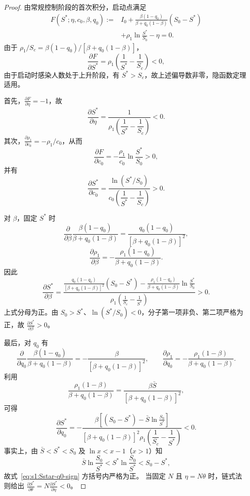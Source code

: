 \documentclass[UTF8,a4paper,10pt,fontset=fandol]{ctexart}
\theoremstyle{cnplain}
\theoremstyle{remark}
\numberwithin{equation}{section}
\begin{document}
\begin{proof}
由常规控制阶段的首次积分，启动点满足
\begin{equation}
\begin{aligned}
F(S^*;\eta,c_0,\beta,q_0)
:={}&
I_0+
\frac{\beta(1-q_0)}
{\beta+q_0(1-\beta)}
(S_0-S^*) \\
&+
\rho_1\ln\frac{S^*}{S_0}
-\eta
=0.
\end{aligned}
\label{eq:s1:F-Sstar-param}
\end{equation}
由于 $\rho_1/S_c=\beta(1-q_0)/[\beta+q_0(1-\beta)]$，
\[
\frac{\partial F}{\partial S^*}
=
\rho_1
\left(
\frac1{S^*}-\frac1{S_c}
\right)<0,
\]
由于启动时感染人数处于上升阶段，有 $S^*>S_c$，故上述偏导数非零，隐函数定理适用。

首先，$\frac{\partial F}{\partial \eta}=-1$，故
\begin{equation}
\frac{\partial S^*}{\partial \eta}
=
\frac{1}{
\rho_1
\left(
\dfrac1{S^*}-\dfrac1{S_c}
\right)
}
<0.
\label{eq:s1:Sstar-eta-sign}
\end{equation}
其次，$\frac{\partial \rho_1}{\partial c_0}=-\rho_1/c_0$，从而
\[
\frac{\partial F}{\partial c_0}
=
-\frac{\rho_1}{c_0}\ln\frac{S^*}{S_0}>0,
\]
并有
\begin{equation}
\frac{\partial S^*}{\partial c_0}
=
\frac{\ln(S^*/S_0)}
{c_0
\left(
\dfrac1{S^*}-\dfrac1{S_c}
\right)
}
>0.
\label{eq:s1:Sstar-c0-sign}
\end{equation}

对 $\beta$，固定 $S^*$ 时
\[
\frac{\partial}{\partial\beta}
\frac{\beta(1-q_0)}
{\beta+q_0(1-\beta)}
=
\frac{q_0(1-q_0)}
{\left[\beta+q_0(1-\beta)\right]^2},
\]
\[
\frac{\partial \rho_1}{\partial \beta}
=
-\frac{\rho_1(1-q_0)}
{\beta+q_0(1-\beta)}.
\]
因此
\begin{equation}
\frac{\partial S^*}{\partial \beta}
=
\frac{
\displaystyle
\frac{q_0(1-q_0)}
{\left[\beta+q_0(1-\beta)\right]^2}
(S_0-S^*)
-
\frac{\rho_1(1-q_0)}
{\beta+q_0(1-\beta)}
\ln\frac{S^*}{S_0}
}{
\displaystyle
\rho_1
\left(
\frac1{S_c}-\frac1{S^*}
\right)
}
>0.
\label{eq:s1:Sstar-beta-sign}
\end{equation}
上式分母为正。由 $S_0>S^*$、$\ln(S^*/S_0)<0$，分子第一项非负、第二项严格为正，故 $\frac{\partial S^*}{\partial \beta}>0$。

最后，对 $q_0$ 有
\[
\frac{\partial}{\partial q_0}
\frac{\beta(1-q_0)}
{\beta+q_0(1-\beta)}
=
-\frac{\beta}
{\left[\beta+q_0(1-\beta)\right]^2},
\qquad
\frac{\partial \rho_1}{\partial q_0}
=
-\frac{\rho_1(1-\beta)}
{\beta+q_0(1-\beta)}.
\]
利用
\[
\frac{\rho_1(1-\beta)}
{\beta+q_0(1-\beta)}
=
\frac{\beta\bar S}
{\left[\beta+q_0(1-\beta)\right]^2},
\]
可得
\begin{equation}
\frac{\partial S^*}{\partial q_0}
=
-\frac{
\beta
\left[
(S_0-S^*)
-\bar S\ln\frac{S_0}{S^*}
\right]
}{
\left[\beta+q_0(1-\beta)\right]^2
\rho_1
\left(
\dfrac1{S_c}-\dfrac1{S^*}
\right)
}
<0.
\label{eq:s1:Sstar-q0-sign}
\end{equation}
事实上，由 $\bar S<S^*<S_0$ 及 $\ln x<x-1$（$x>1$）知
\[
\bar S\ln\frac{S_0}{S^*}
<
S^*\ln\frac{S_0}{S^*}
<
S_0-S^*,
\]
故式~\eqref{eq:s1:Sstar-q0-sign} 方括号内严格为正。
当固定 $N$ 且 $\eta=N\theta$ 时，链式法则给出
$\frac{\partial S^*}{\partial \theta}=N\frac{\partial S^*}{\partial \eta}<0$。
\end{proof}
\end{document}
